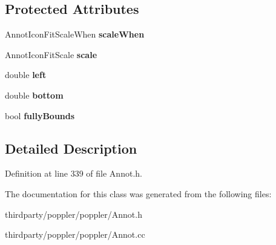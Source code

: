 \subsection*{Protected Attributes}
\begin{DoxyCompactItemize}
\item 
\mbox{\label{class_annot_icon_fit_a131c16405ff152ea47823a9c19e52e31}} 
Annot\+Icon\+Fit\+Scale\+When {\bfseries scale\+When}
\item 
\mbox{\label{class_annot_icon_fit_a16b4d4f288eb4e61ffba32c9aaae3dbc}} 
Annot\+Icon\+Fit\+Scale {\bfseries scale}
\item 
\mbox{\label{class_annot_icon_fit_a7560e04161231e6ea3cfc0238dc0a702}} 
double {\bfseries left}
\item 
\mbox{\label{class_annot_icon_fit_ab344a4961bf7b6435c8fc758e2c8f7f4}} 
double {\bfseries bottom}
\item 
\mbox{\label{class_annot_icon_fit_a951d0c42ada16f93e984d3f578d0db98}} 
bool {\bfseries fully\+Bounds}
\end{DoxyCompactItemize}


\subsection{Detailed Description}


Definition at line 339 of file Annot.\+h.



The documentation for this class was generated from the following files\+:\begin{DoxyCompactItemize}
\item 
thirdparty/poppler/poppler/Annot.\+h\item 
thirdparty/poppler/poppler/Annot.\+cc\end{DoxyCompactItemize}
